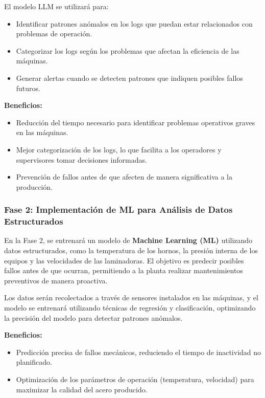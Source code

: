 El modelo LLM se utilizará para:

\begin{itemize}
    \item Identificar patrones anómalos en los logs que puedan estar relacionados con problemas de operación.
    \item Categorizar los logs según los problemas que afectan la eficiencia de las máquinas.
    \item Generar alertas cuando se detecten patrones que indiquen posibles fallos futuros.
\end{itemize}

\textbf{Beneficios:}
\begin{itemize}
    \item Reducción del tiempo necesario para identificar problemas operativos graves en las máquinas.
    \item Mejor categorización de los logs, lo que facilita a los operadores y supervisores tomar decisiones informadas.
    \item Prevención de fallos antes de que afecten de manera significativa a la producción.
\end{itemize}

\subsubsection{Fase 2: Implementación de ML para Análisis de Datos Estructurados}

En la Fase 2, se entrenará un modelo de \textbf{Machine Learning (ML)} utilizando datos estructurados, como la temperatura de los hornos, la presión interna de los equipos y las velocidades de las laminadoras. El objetivo es predecir posibles fallos antes de que ocurran, permitiendo a la planta realizar mantenimientos preventivos de manera proactiva.

Los datos serán recolectados a través de sensores instalados en las máquinas, y el modelo se entrenará utilizando técnicas de regresión y clasificación, optimizando la precisión del modelo para detectar patrones anómalos.

\textbf{Beneficios:}
\begin{itemize}
    \item Predicción precisa de fallos mecánicos, reduciendo el tiempo de inactividad no planificado.
    \item Optimización de los parámetros de operación (temperatura, velocidad) para maximizar la calidad del acero producido.
\end{itemize}

